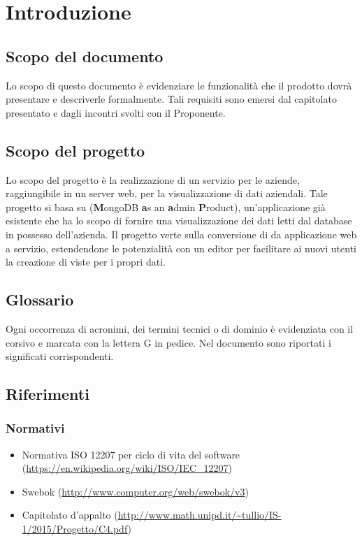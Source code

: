 \section{Introduzione}
\subsection{Scopo del documento}
Lo scopo di questo documento è evidenziare le funzionalit\`a che il prodotto dovr\`a presentare e descriverle formalmente. Tali requisiti sono emersi dal capitolato presentato e dagli incontri svolti con il Proponente.

\subsection{Scopo del progetto}
Lo scopo del progetto è la realizzazione di un servizio per le aziende, raggiungibile in un server web, per la visualizzazione di dati aziendali. Tale progetto si basa su  (\textbf{M}ongoDB \textbf{a}s an \textbf{a}dmin \textbf{P}roduct), un'applicazione già esistente che ha lo scopo di fornire una visualizzazione dei dati letti dal database  in possesso dell'azienda. Il progetto verte sulla conversione di  da applicazione web a servizio, estendendone le potenzialità con un editor per facilitare ai nuovi utenti la creazione di viste per i propri dati.

\subsection{Glossario} 
Ogni occorrenza di acronimi, dei termini tecnici o di dominio è evidenziata con il corsivo e marcata con la lettera G in pedice. Nel documento \Glossario sono riportati i significati corrispondenti.

\subsection{Riferimenti}
\subsubsection{Normativi}
\begin{itemize}
\item Normativa ISO 12207 per ciclo di vita del software (\url{https://en.wikipedia.org/wiki/ISO/IEC_12207})
\item Swebok (\url{http://www.computer.org/web/swebok/v3})
\item Capitolato d'appalto (\url{http://www.math.unipd.it/~tullio/IS-1/2015/Progetto/C4.pdf})
\end{itemize}

